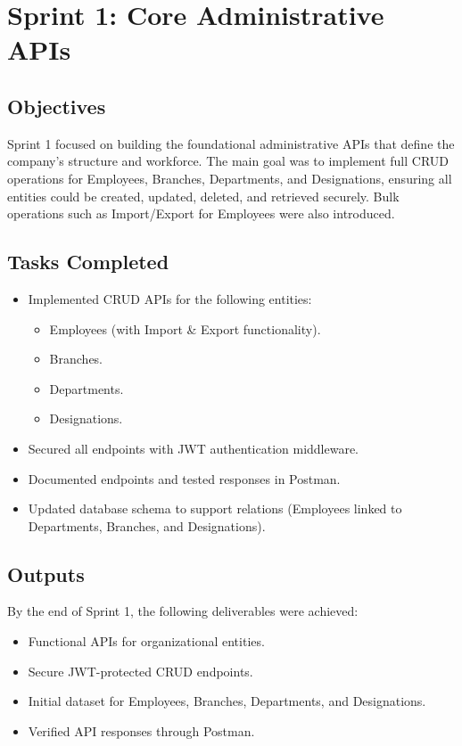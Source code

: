 \section{Sprint 1: Core Administrative APIs}

\subsection{Objectives}
Sprint 1 focused on building the foundational administrative APIs that define the company’s structure and workforce.  
The main goal was to implement full CRUD operations for Employees, Branches, Departments, and Designations, ensuring all entities could be created, updated, deleted, and retrieved securely.  
Bulk operations such as Import/Export for Employees were also introduced.

\subsection{Tasks Completed}
\begin{itemize}
    \item Implemented CRUD APIs for the following entities:
    \begin{itemize}
        \item Employees (with Import \& Export functionality).
        \item Branches.
        \item Departments.
        \item Designations.
    \end{itemize}
    \item Secured all endpoints with JWT authentication middleware.
    \item Documented endpoints and tested responses in Postman.
    \item Updated database schema to support relations (Employees linked to Departments, Branches, and Designations).
\end{itemize}

\subsection{Outputs}
By the end of Sprint 1, the following deliverables were achieved:
\begin{itemize}
    \item Functional APIs for organizational entities.
    \item Secure JWT-protected CRUD endpoints.
    \item Initial dataset for Employees, Branches, Departments, and Designations.
    \item Verified API responses through Postman.
\end{itemize}

